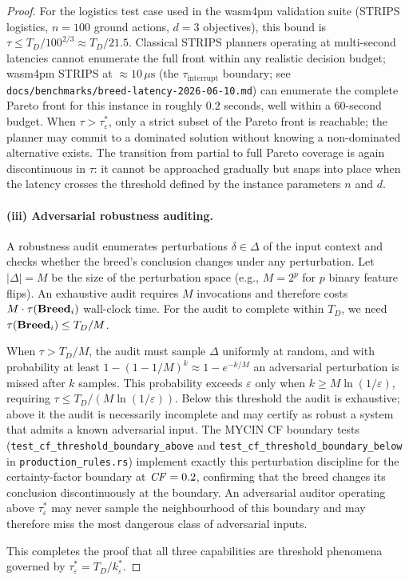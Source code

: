 \begin{proof}
For the logistics test case used in the wasm4pm validation suite (STRIPS logistics,
$n = 100$ ground actions, $d = 3$ objectives), this bound is
$\tau \leq T_D / 100^{2/3} \approx T_D / 21.5$.
Classical STRIPS planners operating at multi-second latencies cannot enumerate the full
front within any realistic decision budget; wasm4pm STRIPS at $\approx 10\,\mu\text{s}$
(the $\tau_{\text{interrupt}}$ boundary; see \texttt{docs/benchmarks/breed-latency-2026-06-10.md})
can enumerate the complete Pareto front for this instance in roughly $0.2$ seconds, well
within a 60-second budget.
When $\tau > \tau^*_\varepsilon$, only a strict subset of the Pareto front is reachable;
the planner may commit to a dominated solution without knowing a non-dominated alternative
exists.  The transition from partial to full Pareto coverage is again discontinuous in
$\tau$: it cannot be approached gradually but snaps into place when the latency crosses
the threshold defined by the instance parameters $n$ and $d$.

\paragraph{(iii) Adversarial robustness auditing.}
A robustness audit enumerates perturbations $\delta \in \Delta$ of the input context and
checks whether the breed's conclusion changes under any perturbation.  Let
$|\Delta| = M$ be the size of the perturbation space (e.g., $M = 2^p$ for $p$ binary
feature flips).  An exhaustive audit requires $M$ invocations and therefore costs
$M \cdot \tau(\mathbf{Breed}_i)$ wall-clock time.  For the audit to complete within $T_D$, we
need $\tau(\mathbf{Breed}_i) \leq T_D / M$.

When $\tau > T_D / M$, the audit must sample $\Delta$ uniformly at random, and with
probability at least $1 - (1 - 1/M)^k \approx 1 - e^{-k/M}$ an adversarial perturbation
is missed after $k$ samples.  This probability exceeds $\varepsilon$ only when
$k \geq M \ln(1/\varepsilon)$, requiring $\tau \leq T_D / (M \ln(1/\varepsilon))$.
Below this threshold the audit is exhaustive; above it the audit is necessarily
incomplete and may certify as robust a system that admits a known adversarial input.
The MYCIN CF boundary tests
(\texttt{test\_cf\_threshold\_boundary\_above} and \texttt{test\_cf\_threshold\_boundary\_below}
in \texttt{production\_rules.rs}) implement exactly this perturbation discipline for the
certainty-factor boundary at $\mathit{CF} = 0.2$, confirming that the breed changes its
conclusion discontinuously at the boundary.  An adversarial auditor operating above
$\tau^*_\varepsilon$ may never sample the neighbourhood of this boundary and may therefore
miss the most dangerous class of adversarial inputs.

This completes the proof that all three capabilities are threshold phenomena governed by
$\tau^*_\varepsilon = T_D / k^*_\varepsilon$.
\end{proof}

